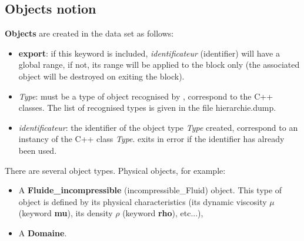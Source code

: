 


\subsection{Objects notion}
\textbf{Objects} are created in the data set as follows:
    \begin{center}
    \end{center}

\begin{itemize}
\item \textbf{export}: if this keyword is included, \textit{identificateur} (identifier) will have a global range, if not, its range will be applied to the block only (the associated object will be destroyed on exiting the block).
\item \textit{Type}: must be a type of object recognised by \trust, correspond to the C++ classes. The list of recognised types is given in the file hierarchie.dump.
\item \textit{identificateur}: the identifier of the object type \textit{Type} created, correspond to an instancy of the C++ class \textit{Type}. \trust exits in error if the identifier has already been used.
\end{itemize}

There are several object types. Physical objects, for example:

\begin{itemize}
\item A \textbf{Fluide\_incompressible} (incompressible\_Fluid) object. This type of object is defined by its physical characteristics (its dynamic viscosity $\mu$ (keyword \textbf{mu}), its density $\rho$ (keyword \textbf{rho}), etc...),
\item A \textbf{Domaine}.
\end{itemize}

